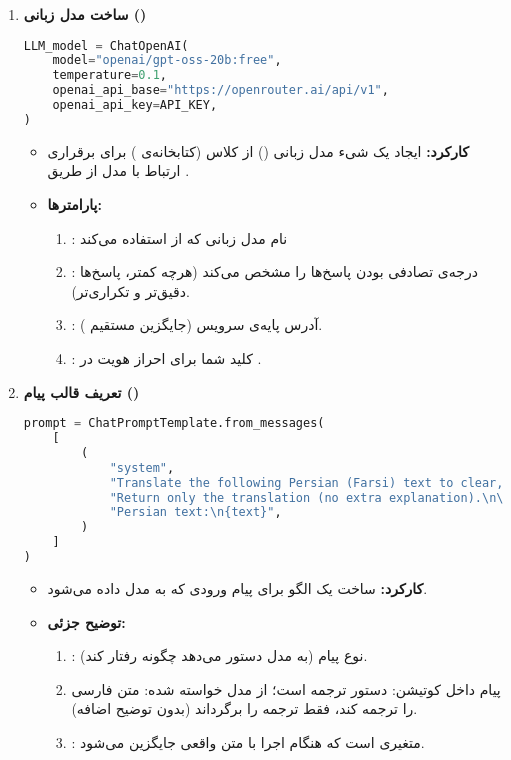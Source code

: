 \documentclass{article}
\begin{document}
\begin{enumerate}
    \item \textbf{ساخت مدل زبانی ()}
    \begin{latin}
        \begin{lstlisting}[language=Python]
LLM_model = ChatOpenAI(
    model="openai/gpt-oss-20b:free",
    temperature=0.1,
    openai_api_base="https://openrouter.ai/api/v1",
    openai_api_key=API_KEY,
)
        \end{lstlisting}
    \end{latin}
    \begin{itemize}
        \item \textbf{کارکرد:} ایجاد یک شیء مدل زبانی () از کلاس  (کتابخانه‌ی ) برای برقراری ارتباط با مدل  از طریق .
        \item \textbf{پارامترها:}
        \begin{enumerate}
            \item {}: نام مدل زبانی که از  استفاده می‌کند
            \item {}: درجه‌ی تصادفی بودن پاسخ‌ها را مشخص می‌کند (هرچه کمتر، پاسخ‌ها دقیق‌تر و تکراری‌تر).
            \item {}: آدرس پایه‌ی  سرویس  (جایگزین مستقیم ).
            \item {}: کلید  شما برای احراز هویت در .
        \end{enumerate}
    \end{itemize}

    \item \textbf{تعریف قالب پیام ()}
    \begin{latin}
        \begin{lstlisting}[language=Python]
prompt = ChatPromptTemplate.from_messages(
    [
        (
            "system",
            "Translate the following Persian (Farsi) text to clear, natural English.\n"
            "Return only the translation (no extra explanation).\n\n"
            "Persian text:\n{text}",
        )
    ]
)
        \end{lstlisting}
    \end{latin}
    \begin{itemize}
        \item \textbf{کارکرد:} ساخت یک الگو برای پیام ورودی که به مدل داده می‌شود.
        \item \textbf{توضیح جزئی:}
        \begin{enumerate}
            \item {}: نوع پیام (به مدل دستور می‌دهد چگونه رفتار کند).
            \item پیام داخل کوتیشن: دستور ترجمه است؛ از مدل خواسته شده: متن فارسی را ترجمه کند، فقط ترجمه را برگرداند (بدون توضیح اضافه).
            \item {}: متغیری است که هنگام اجرا با متن واقعی جایگزین می‌شود.
        \end{enumerate}
    \end{itemize}


\end{enumerate}
\end{document}
